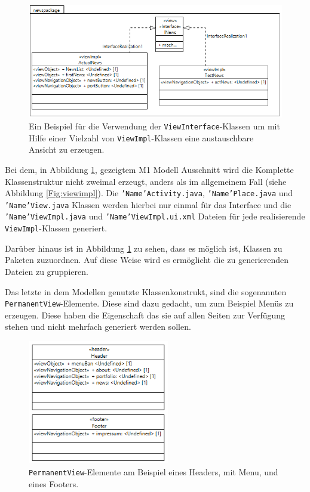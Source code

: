 \begin{figure}[htbp]
\begin{center}
\includegraphics[width=1.0\textwidth]{./img/GWT-Model-Views-interface.png}
\caption{Ein Beispiel für die Verwendung der \texttt{ViewInterface}-Klassen
um mit Hilfe einer Vielzahl von \texttt{ViewImpl}-Klassen
eine austauschbare Ansicht zu erzeugen.}\label{Fig:viewInterface}
\end{center}
\end{figure} 

Bei dem, in Abbildung \ref{Fig:viewInterface}, gezeigtem M1 Modell Ausschnitt
wird die Komplette Klassenstruktur nicht zweimal erzeugt, anders als im
allgemeinem Fall (siehe Abbildung \ref{Fig:viewimpl}). Die
\texttt{'Name'Activity.java}, \texttt{'Name'Place.java} und \\
\texttt{'Name'View.java} Klassen werden hierbei nur einmal für das Interface
und die \texttt{'Name'ViewImpl.java} und \texttt{'Name'ViewImpl.ui.xml}
Dateien für jede realisierende \texttt{ViewImpl}-Klassen generiert. 

Darüber hinaus ist in Abbildung \ref{Fig:viewInterface} zu sehen, dass es
möglich ist, Klassen zu Paketen zuzuordnen. Auf diese Weise wird es
ermöglicht die zu generierenden Dateien zu gruppieren. 

\newpage
Das letzte in dem Modellen genutzte Klassenkonstrukt, sind die sogenannten
\texttt{PermanentView}-Elemente. Diese sind dazu gedacht, um zum Beispiel Menüs
zu erzeugen. Diese haben die Eigenschaft das sie auf allen Seiten zur Verfügung
stehen und nicht mehrfach generiert werden sollen.

\begin{figure}[htbp]
\begin{center}
\includegraphics[width=0.55\textwidth]{./img/Header_Footer.png}
\caption{\texttt{PermanentView}-Elemente am Beispiel
eines Headers, mit Menu, und eines Footers.}\label{Fig:headerFooter}
\end{center}
\end{figure} 

